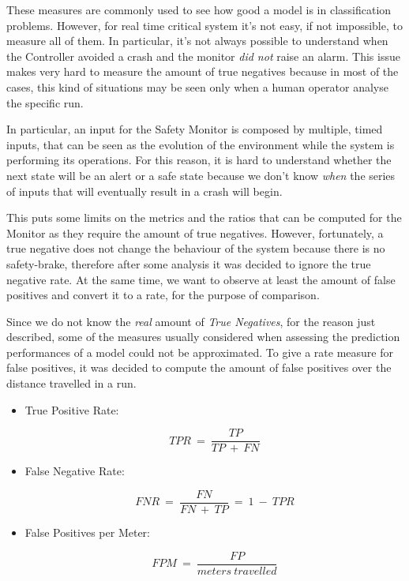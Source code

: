 These measures are commonly used to see how good a model is in classification problems. However, for real time critical system it's not easy, if not impossible, to measure all of them. In particular, it's not always possible to understand when the Controller avoided a crash and the monitor \textsl{did not} raise an alarm. This issue makes very hard to measure the amount of true negatives because in most of the cases, this kind of situations may be seen only when a human operator analyse the specific run.

In particular, an input for the Safety Monitor is composed by multiple, timed inputs, that can be seen as the evolution of the environment while the system is performing its operations. For this reason, it is hard to understand whether the next state will be an alert or a safe state because we don't know \textsl{when} the series of inputs that will eventually result in a crash will begin.

This puts some limits on the metrics and the ratios that can be computed for the Monitor as they require the amount of true negatives. However, fortunately, a true negative does not change the behaviour of the system because there is no safety-brake, therefore after some analysis it was decided to ignore the true negative rate. At the same time, we want to observe at least the amount of false positives and convert it to a rate, for the purpose of comparison.\newline

Since we do not know the \textsl{real} amount of \textsl{True Negatives}, for the reason just described, some of the measures usually considered when assessing the prediction performances of a model could not be approximated. To give a rate measure for false positives, it was decided to compute the amount of false positives over the distance travelled in a run.

\begin{itemize}
	\item True Positive Rate:
	\vspace{-0.5cm}
	\begin{center}
		\begin{equation}
		TPR\: =\: \frac{TP}{TP\: +\: FN}
		\end{equation}
	\end{center}
	\item False Negative Rate:
	\vspace{-0.5cm}
	\begin{center}
		\begin{equation}
		FNR\: =\: \frac{FN}{FN\: +\: TP}\: =\: 1\: -\: TPR
		\end{equation}
	\end{center}
	\item False Positives per Meter:
	\vspace{-0.5cm}
	\begin{center}
		\begin{equation}
		FPM\: =\: \frac{FP}{meters\: travelled}
		\end{equation}
	\end{center}
\end{itemize}

